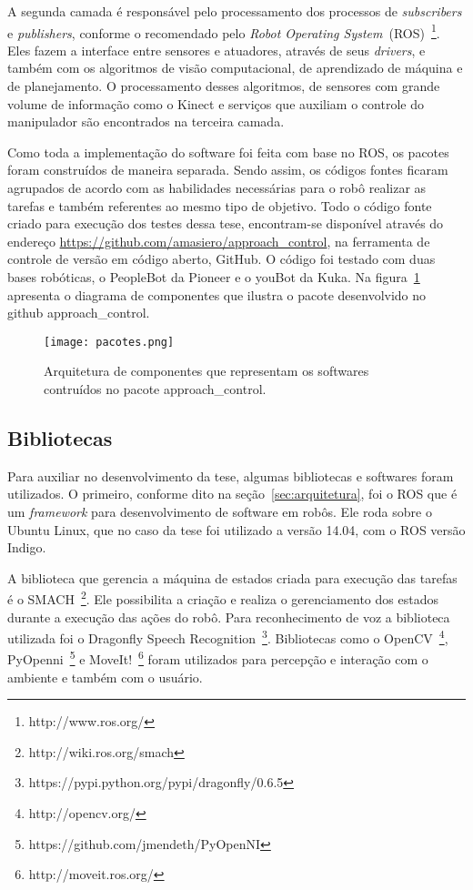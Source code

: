 A segunda camada é responsável pelo processamento dos processos de \emph{subscribers} e \emph{publishers}, conforme o recomendado pelo \emph{Robot Operating System}~(ROS)~\footnote{http://www.ros.org/}. Eles fazem a interface entre sensores e atuadores, através de seus \emph{drivers}, e também com os algoritmos de visão computacional, de aprendizado de máquina e de planejamento. O processamento desses algoritmos, de sensores com grande volume de informação como o Kinect e serviços que auxiliam o controle do manipulador são encontrados na terceira camada.

Como toda a implementação do software foi feita com base no ROS, os pacotes foram construídos de maneira separada. Sendo assim, os códigos fontes ficaram agrupados de acordo com as habilidades necessárias para o robô realizar as tarefas e também referentes ao mesmo tipo de objetivo. Todo o código fonte criado para execução dos testes dessa tese, encontram-se disponível através do endereço \url{https://github.com/amasiero/approach_control}, na ferramenta de controle de versão em código aberto, GitHub. O código foi testado com duas bases robóticas, o PeopleBot da Pioneer e o youBot da Kuka. Na figura~\ref{fig:pacotes} apresenta o diagrama de componentes que ilustra o pacote desenvolvido no github approach\_control.

\begin{figure}[ht!]
	\centering
	\begin{minipage}{0.9\textwidth}
		\caption{Arquitetura de componentes que representam os softwares contruídos no pacote approach\_control.}
		\texttt{[image: pacotes.png]}
		\label{fig:pacotes}
	\end{minipage}
\end{figure}

\subsection{Bibliotecas}
\label{sec:bibliotecas}
Para auxiliar no desenvolvimento da tese, algumas bibliotecas e softwares foram utilizados. O primeiro, conforme dito na seção~\ref{sec:arquitetura}, foi o ROS que é um \emph{framework} para desenvolvimento de software em robôs. Ele roda sobre o Ubuntu Linux, que no caso da tese foi utilizado a versão 14.04, com o ROS versão Indigo.

A biblioteca que gerencia a máquina de estados criada para execução das tarefas é o SMACH~\footnote{http://wiki.ros.org/smach}. Ele possibilita a criação e realiza o gerenciamento dos estados durante a execução das ações do robô. Para reconhecimento de voz a biblioteca utilizada foi o Dragonfly Speech Recognition~\footnote{https://pypi.python.org/pypi/dragonfly/0.6.5}. Bibliotecas como o OpenCV~\footnote{http://opencv.org/}, PyOpenni~\footnote{https://github.com/jmendeth/PyOpenNI} e MoveIt!~\footnote{http://moveit.ros.org/} foram utilizados para percepção e interação com o ambiente e também com o usuário.

